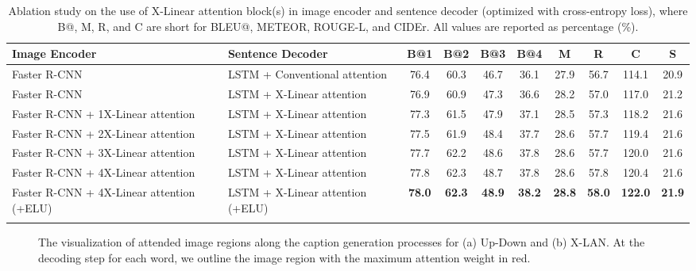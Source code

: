 \documentclass[10pt,twocolumn,letterpaper]{article}
\begin{document}
\begin{table*}[!tb]\scriptsize
\centering
\caption{\small Ablation study on the use of X-Linear attention block(s) in image encoder and sentence decoder (optimized with cross-entropy loss), where B@, M, R, and C are short for BLEU@, METEOR, ROUGE-L, and CIDEr. All values are reported as percentage (\%).}
    \label{table:ablation}
\begin{tabular}{l|l|cccccccc}
\Xhline{2\arrayrulewidth}
Image Encoder & Sentence Decoder & B@1 & B@2 & B@3 & B@4 & M & R & C & S \\ \hline\hline
Faster R-CNN & LSTM + Conventional attention & 76.4 & 60.3 & 46.7 & 36.1 & 27.9 & 56.7 & 114.1 & 20.9 \\
Faster R-CNN & LSTM + X-Linear attention & 76.9 & 60.9 & 47.3 & 36.6 & 28.2 & 57.0 & 117.0 & 21.2 \\\hline
Faster R-CNN + 1X-Linear attention & LSTM + X-Linear attention & 77.3 & 61.5 & 47.9 & 37.1 & 28.5 & 57.3 & 118.2 & 21.6 \\
Faster R-CNN + 2X-Linear attention & LSTM + X-Linear attention & 77.5 & 61.9 & 48.4 & 37.7 & 28.6 & 57.7 & 119.4 & 21.6 \\
Faster R-CNN + 3X-Linear attention & LSTM + X-Linear attention & 77.7 & 62.2 & 48.6 & 37.8 & 28.6 & 57.7 & 120.0 & 21.6 \\
Faster R-CNN + 4X-Linear attention & LSTM + X-Linear attention & 77.8 & 62.3 & 48.7 & 37.8 & 28.6 & 57.8 & 120.4 & 21.6 \\\hline
Faster R-CNN + 4X-Linear attention (+ELU) & LSTM + X-Linear attention (+ELU) & \textbf{78.0} & \textbf{62.3} & \textbf{48.9} & \textbf{38.2} & \textbf{28.8} & \textbf{58.0} & \textbf{122.0} & \textbf{21.9} \\ \Xhline{2\arrayrulewidth}
\end{tabular}
\end{table*}



\begin{figure*}[!tb]
\vspace{-0.18in}
\vspace{-0.2in}
\caption{\small The visualization of attended image regions along the caption generation processes for (a) Up-Down and (b) X-LAN. At the decoding step for each word, we outline the image region with the maximum attention weight in red.}
\label{fig:att}
\vspace{-0.22in}
\end{figure*}
\end{document}
